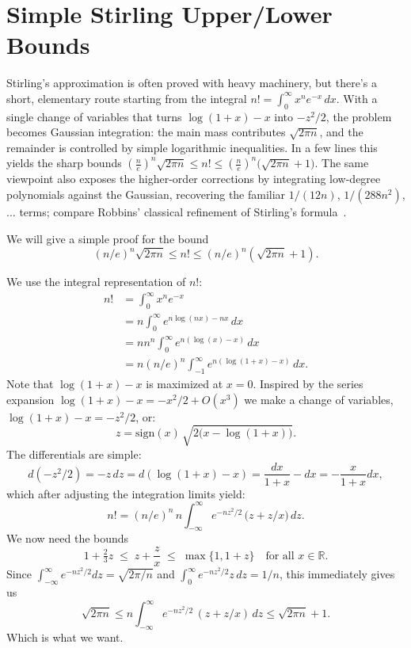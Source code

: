 \documentclass[11pt]{article}
\newcommand{\R}{\mathbb{R}}
\begin{document}
\section*{Simple Stirling Upper/Lower Bounds}

Stirling's approximation is often proved with heavy machinery, but there's a short, elementary route starting from the integral $n! = \int_0^\infty x^n e^{-x} \, dx$. With a single change of variables that turns $\log(1+x) - x$ into $-z^{2}/2$, the problem becomes Gaussian integration: the main mass contributes $\sqrt{2\pi n}$, and the remainder is controlled by simple logarithmic inequalities. In a few lines this yields the sharp bounds $\left(\frac{n}{e}\right)^n\sqrt{2\pi n} \le n! \le \left(\frac{n}{e}\right)^n\bigl(\sqrt{2\pi n}+1\bigr)$. The same viewpoint also exposes the higher-order corrections by integrating low-degree polynomials against the Gaussian, recovering the familiar $1/(12n)$, $1/(288n^2)$, $\ldots$ terms; compare Robbins' classical refinement of Stirling's formula~\cite{robbins1955}.

We will give a simple proof for the bound
\[
 (n/e)^n\sqrt{2\pi n}
 \le
 n! \le (n/e)^n(\sqrt{2\pi n}+1).
\]

We use the integral representation of $n!$:
\begin{align*}
    n!
    &= \int_0^\infty x^n e^{-x} \\
    &= n\int_0^\infty e^{n \log(nx) - nx} \, dx \\
    &= n n^{n}\int_0^\infty e^{n (\log(x) - x)} \, dx \\
    &= n (n/e)^{n}\int_{-1}^\infty e^{n (\log(1+x) - x)} \, dx.
\end{align*}
Note that $\log(1+x)-x$ is maximized at $x=0$.
Inspired by the series expansion $\log(1+x)-x=-x^2/2 + O(x^3)$ we make a change of variables,
$\log(1+x)-x=-z^2/2$, or:
\[
z = \mathrm{sign}(x)\,\sqrt{2\bigl(x-\log(1+x)\bigr)}.
\]
The differentials are simple:
\[
d(-z^2/2)=
-z\,dz = d(\log(1+x)-x) = \frac{dx}{1+x} - dx = -\frac{x}{1+x}dx,
\]
which after adjusting the integration limits yield:
\[
    n!
    = (n/e)^{n} \, n\int_{-\infty}^\infty e^{-nz^2/2} \, \bigl(z+z/x\bigr) \, dz.
\]
We now need the bounds
\begin{equation}
    1+\tfrac{2}{3}z
    \;\le\; z+\frac{z}{x} \;\le\; \max\{1, 1+z\}
    \quad\text{for all }x\in\R.
    \label{eq:mid}
\end{equation}
Since $\int_{-\infty}^\infty e^{-nz^2/2}dz=\sqrt{2\pi/n}$ and $\int_{0}^\infty e^{-nz^2/2} z\, dz=1/n$,
this immediately gives us
\[
\sqrt{2\pi n}
\le
n\int_{-\infty}^\infty e^{-nz^2/2} \, (z+z/x) \, dz
\le
\sqrt{2\pi n} + 1.
\]
Which is what we want.
\end{document}
